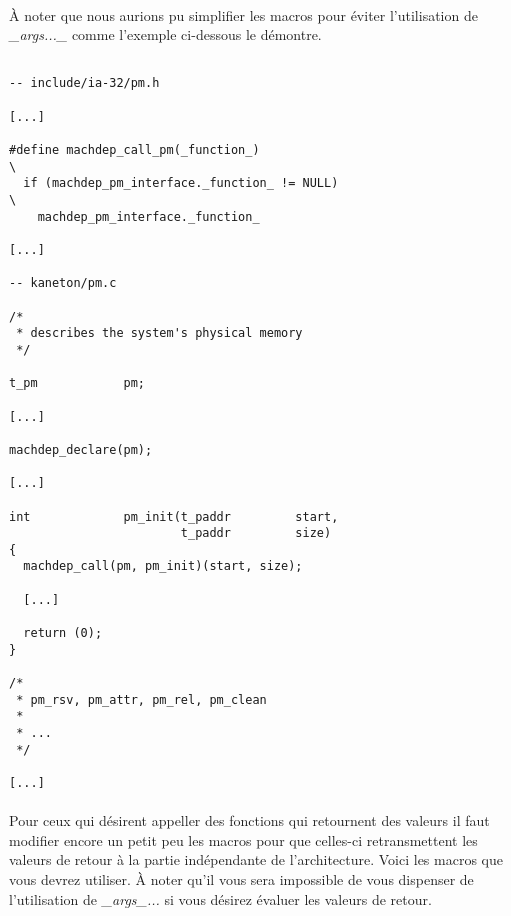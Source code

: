 \documentclass[10pt,a4wide]{article}
\begin{document}
\paragraph{}

\`A noter que nous aurions pu simplifier les macros pour \'eviter l'utilisation
de \textit{\_args...\_} comme l'exemple ci-dessous le d\'emontre.

\begin{verbatim}

-- include/ia-32/pm.h

[...]

#define machdep_call_pm(_function_)                                     \
  if (machdep_pm_interface._function_ != NULL)                          \
    machdep_pm_interface._function_

[...]

-- kaneton/pm.c

/*
 * describes the system's physical memory
 */

t_pm            pm;

[...]

machdep_declare(pm);

[...]

int             pm_init(t_paddr         start,
                        t_paddr         size)
{
  machdep_call(pm, pm_init)(start, size);

  [...]

  return (0);
}

/*
 * pm_rsv, pm_attr, pm_rel, pm_clean
 *
 * ...
 */

[...]

\end{verbatim}

\paragraph{}

Pour ceux qui d\'esirent appeller des fonctions qui retournent des valeurs
il faut modifier encore un petit peu les macros pour que celles-ci retransmettent
les valeurs de retour \`a la partie ind\'ependante de l'architecture.
Voici les macros que vous devrez utiliser. \`A noter qu'il vous sera impossible
de vous dispenser de l'utilisation de \textit{\_args\_...} si vous d\'esirez
\'evaluer les valeurs de retour.
\end{document}
